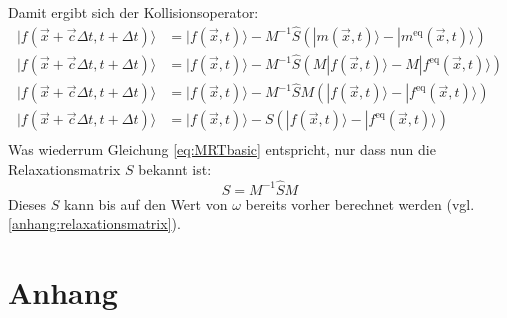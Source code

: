 \documentclass[a4paper,10pt]{scrreprt}
\begin{document}
Damit ergibt sich der Kollisionsoperator:
\begin{align}
 | f(\vec{x} + \vec{c} \Delta t, t + \Delta t) \rangle &= | f(\vec{x},t) \rangle - M^{-1} \hat{S} \left( | m(\vec{x},t) \rangle - | m^{\text{eq}}(\vec{x},t) \rangle \right) \\
 | f(\vec{x} + \vec{c} \Delta t, t + \Delta t) \rangle &= | f(\vec{x},t) \rangle - M^{-1} \hat{S} \left( M | f(\vec{x},t) \rangle - M | f^{\text{eq}}(\vec{x},t) \rangle \right) \\
 | f(\vec{x} + \vec{c} \Delta t, t + \Delta t) \rangle &= | f(\vec{x},t) \rangle - M^{-1} \hat{S} M \left( | f(\vec{x},t) \rangle - | f^{\text{eq}}(\vec{x},t) \rangle \right) \\
 | f(\vec{x} + \vec{c} \Delta t, t + \Delta t) \rangle &= | f(\vec{x},t) \rangle - S  \left( | f(\vec{x},t) \rangle - | f^{\text{eq}}(\vec{x},t) \rangle \right) \\
\end{align}
Was wiederrum Gleichung \eqref{eq:MRTbasic} entspricht, nur dass nun die Relaxationsmatrix $S$ bekannt ist:
\begin{equation}
 S = M^{-1} \hat{S} M
\end{equation}
Dieses $S$ kann bis auf den Wert von $\omega$ bereits vorher berechnet werden (vgl. \autoref{anhang:relaxationsmatrix}).

\appendix
\chapter{Anhang}
\end{document}
